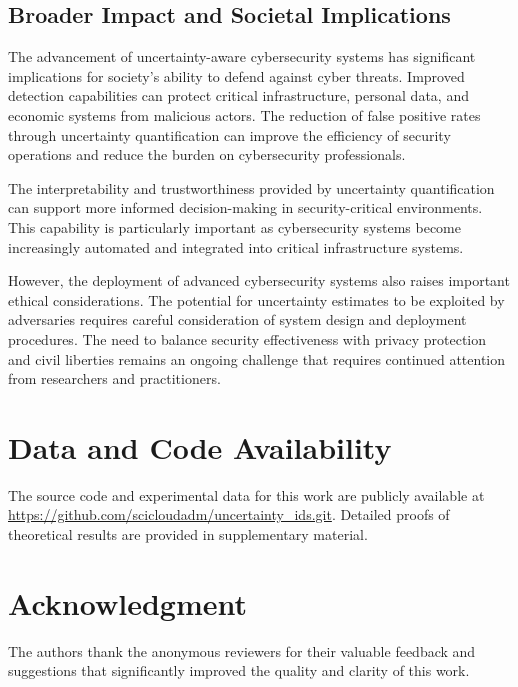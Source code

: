 \documentclass[journal]{IEEEtran}
\begin{document}
\subsection{Broader Impact and Societal Implications}

The advancement of uncertainty-aware cybersecurity systems has significant implications for society's ability to defend against cyber threats. Improved detection capabilities can protect critical infrastructure, personal data, and economic systems from malicious actors. The reduction of false positive rates through uncertainty quantification can improve the efficiency of security operations and reduce the burden on cybersecurity professionals.

The interpretability and trustworthiness provided by uncertainty quantification can support more informed decision-making in security-critical environments. This capability is particularly important as cybersecurity systems become increasingly automated and integrated into critical infrastructure systems.

However, the deployment of advanced cybersecurity systems also raises important ethical considerations. The potential for uncertainty estimates to be exploited by adversaries requires careful consideration of system design and deployment procedures. The need to balance security effectiveness with privacy protection and civil liberties remains an ongoing challenge that requires continued attention from researchers and practitioners.

\section*{Data and Code Availability}

The source code and experimental data for this work are publicly available at \url{https://github.com/scicloudadm/uncertainty_ids.git}. Detailed proofs of theoretical results are provided in supplementary material.

\section*{Acknowledgment}

The authors thank the anonymous reviewers for their valuable feedback and suggestions that significantly improved the quality and clarity of this work.



\end{document}
